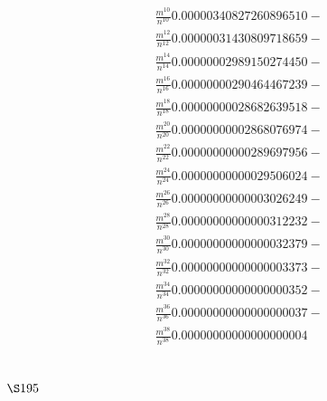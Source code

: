 \[
\begin{aligned}
& \frac{m^{10}}{n^{10}} 0.00000340827260896510- \\
& \frac{m^{12}}{n^{12}} 0.00000031430809718659- \\
& \frac{m^{14}}{n^{14}} 0.00000002989150274450- \\
& \frac{m^{16}}{n^{16}} 0.00000000290464467239- \\
& \frac{m^{18}}{n^{18}} 0.00000000028682639518- \\
& \frac{m^{20}}{n^{20}} 0.00000000002868076974- \\
& \frac{m^{22}}{n^{22}} 0.00000000000289697956- \\
& \frac{m^{24}}{n^{24}} 0.00000000000029506024- \\
& \frac{m^{26}}{n^{26}} 0.00000000000003026249- \\
& \frac{m^{28}}{n^{28}} 0.00000000000000312232- \\
& \frac{m^{30}}{n^{30}} 0.00000000000000032379- \\
& \frac{m^{32}}{n^{32}} 0.00000000000000003373- \\
& \frac{m^{34}}{n^{34}} 0.00000000000000000352- \\
& \frac{m^{36}}{n^{36}} 0.00000000000000000037- \\
& \frac{m^{38}}{n^{38}} 0.00000000000000000004
\end{aligned}
\]
\section{$\S 195$}

